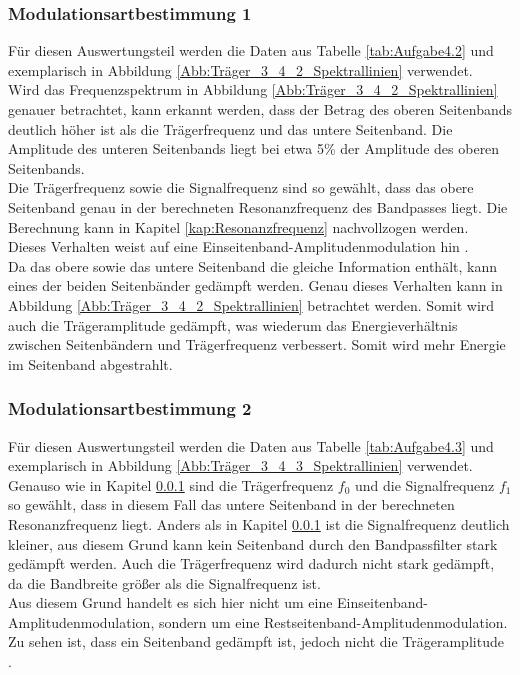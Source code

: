 \documentclass[12pt]{scrartcl}
\begin{document}
\subsubsection{Modulationsartbestimmung 1}
\label{kap:4.2}
Für diesen Auswertungsteil werden die Daten aus Tabelle \ref{tab:Aufgabe4.2} und exemplarisch in Abbildung \ref{Abb:Träger_3_4_2_Spektrallinien} verwendet.\\
Wird das Frequenzspektrum in Abbildung \ref{Abb:Träger_3_4_2_Spektrallinien} genauer betrachtet, kann erkannt werden, dass der Betrag des oberen Seitenbands deutlich höher ist als die Trägerfrequenz und das untere Seitenband. 
Die Amplitude des unteren Seitenbands liegt bei etwa 5\% der Amplitude des oberen Seitenbands.\\
Die Trägerfrequenz sowie die Signalfrequenz sind so gewählt, dass das obere Seitenband genau in der berechneten Resonanzfrequenz des Bandpasses liegt. 
Die Berechnung kann in Kapitel \ref{kap:Resonanzfrequenz} nachvollzogen werden.\\
Dieses Verhalten weist auf eine Einseitenband-Amplitudenmodulation hin \cite{GoldenbaumGitskript}.\\
Da das obere sowie das untere Seitenband die gleiche Information enthält, kann eines der beiden Seitenbänder gedämpft werden.
Genau dieses Verhalten kann in Abbildung \ref{Abb:Träger_3_4_2_Spektrallinien} betrachtet werden.
Somit wird auch die Trägeramplitude gedämpft, was wiederum das Energieverhältnis zwischen Seitenbändern und Trägerfrequenz verbessert. 
Somit wird mehr Energie im Seitenband abgestrahlt.

\subsubsection{Modulationsartbestimmung 2}
\label{kap:4.3}
Für diesen Auswertungsteil werden die Daten aus Tabelle \ref{tab:Aufgabe4.3} und exemplarisch in Abbildung \ref{Abb:Träger_3_4_3_Spektrallinien} verwendet.\\
Genauso wie in Kapitel \ref{kap:4.2} sind die Trägerfrequenz $f_0$ und die Signalfrequenz $f_1$ so gewählt, dass in diesem Fall das untere Seitenband in der berechneten Resonanzfrequenz liegt. 
Anders als in Kapitel \ref{kap:4.2} ist die Signalfrequenz deutlich kleiner, aus diesem Grund kann kein Seitenband durch den Bandpassfilter stark gedämpft werden.
Auch die Trägerfrequenz wird dadurch nicht stark gedämpft, da die Bandbreite größer als die Signalfrequenz ist.\\
Aus diesem Grund handelt es sich hier nicht um eine Einseitenband-Amplitudenmodulation, sondern um eine Restseitenband-Amplitudenmodulation.\\
Zu sehen ist, dass ein Seitenband gedämpft ist, jedoch nicht die Trägeramplitude \cite{GoldenbaumGitskript}.\newpage
\end{document}

